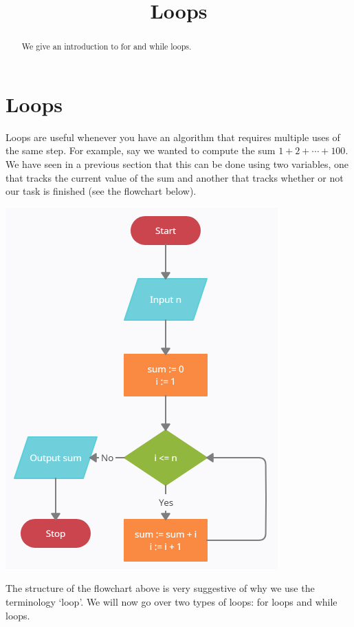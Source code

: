\documentclass{ximera}
\title{Loops}
\begin{document}
  
\begin{abstract}  
We give an introduction to for and while loops.
\end{abstract}  
\maketitle

\section{Loops}

Loops are useful whenever you have an algorithm that requires multiple uses of the same step. For example, say we wanted to compute the sum $1+2+\cdots+100$. We have seen in a previous section that this can be done using two variables, one that tracks the current value of the sum and another that tracks whether or not our task is finished (see the flowchart below).

\begin{center}
	    \includegraphics{gausssum.png}
\end{center}

The structure of the flowchart above is very suggestive of why we use the terminology `loop'. We will now go over two types of loops: for loops and while loops.
\end{document}
